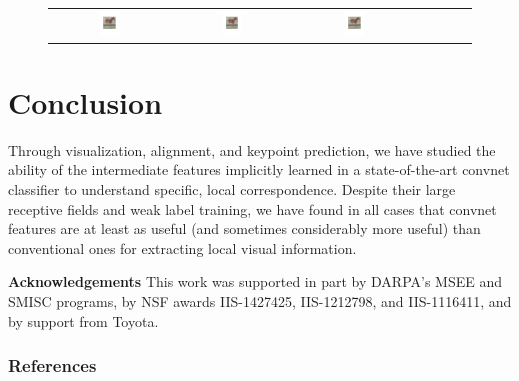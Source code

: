 \documentclass{article} %
\begin{document}
\begin{figure}[t]
\begin{minipage}{\textwidth}
{\begin{tabular}{ccccccc}
\includegraphics[width=0.17\textwidth]{figures/horse_2_gt} &
\includegraphics[width=0.17\textwidth]{figures/horse_2_sift} &
\includegraphics[width=0.17\textwidth]{figures/horse_2_conv} \\
\end{tabular}
}
\label{fig:keypointprediction}
\end{minipage}
\end{figure}
\section{Conclusion}

Through visualization, alignment, and keypoint prediction, we have studied the
ability of the intermediate features implicitly learned in a state-of-the-art
convnet classifier to understand specific, local correspondence.
Despite their large receptive fields and weak label training, we have found in
all cases that convnet features are at least as useful (and sometimes
considerably more useful) than conventional ones for extracting local
visual information.

{\small
\textbf{Acknowledgements}\hspace{1ex} This work was supported in part by DARPA's MSEE and SMISC programs, by NSF awards
IIS-1427425, IIS-1212798, and IIS-1116411, and by support from Toyota.
}

\subsubsection*{References}

\begingroup
\renewcommand{\section}[2]{}
\small{


}
\endgroup
\end{document}
